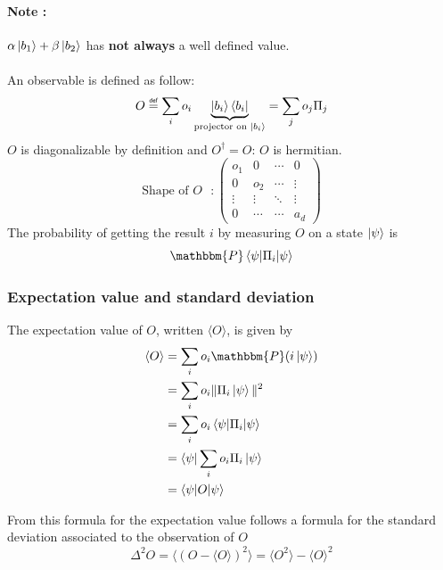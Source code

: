 \documentclass{article}
\newcommand\eqdef{\mathrel{\overset{\makebox[0pt]{\mbox{\normalfont\tiny\sffamily
def}}}{=}}}
\begin{document}
\paragraph{Note :} $\alpha\ket{b_1} + \beta\ket{b_2}$ has \textbf{not always} a
well defined value. \\
\\
An observable is defined as follow:
\begin{equation}
    O \eqdef \sum_i o_i \underbrace{\ket{b_i}\bra{b_i}}_{\text{projector on $\ket{b_i}$}}
    = \sum_j o_j \Pi_j
\end{equation}
$O$ is diagonalizable by definition and $O^\dagger = O$: $O$ is hermitian.
\begin{equation}
\text{Shape of $O$ } :
\begin{pmatrix}
    o_1 & 0 & \cdots & 0 \\
    0 & o_2 & \cdots & \vdots \\
    \vdots  & \vdots  & \ddots & \vdots  \\
    0 & \cdots & \cdots & a_d
\end{pmatrix}
\end{equation}
The probability of getting the result $i$ by measuring $O$ on a state
$\ket{\psi}$ is
\begin{equation}
\mathbbm{P}\braket{\psi|\Pi_i|\psi}
\end{equation}
\subsubsection*{Expectation value and standard deviation}

The expectation value of $O$, written $\langle O\rangle$, is given by
\begin{equation}
    \begin{aligned}
        \langle O\rangle
            & = \sum_i o_i \mathbbm{P}(i\ket{\psi}) \\
            & = \sum_i o_i \|\Pi_i\ket{\psi}\|^2 \\
            & = \sum_i o_i \braket{\psi|\Pi_i|\psi} \\
            & = \bra{\psi}\sum_i o_i \Pi_i \ket{\psi} \\
            & = \braket{\psi | O |\psi}
    \end{aligned}
\end{equation}

From this formula for the expectation value follows a formula for the standard
deviation associated to the observation of $O$
\begin{equation}
    \Delta^2 O = \langle(O - \langle O \rangle)^2\rangle = \langle O^2 \rangle - \langle O \rangle^2
\end{equation}
\end{document}
